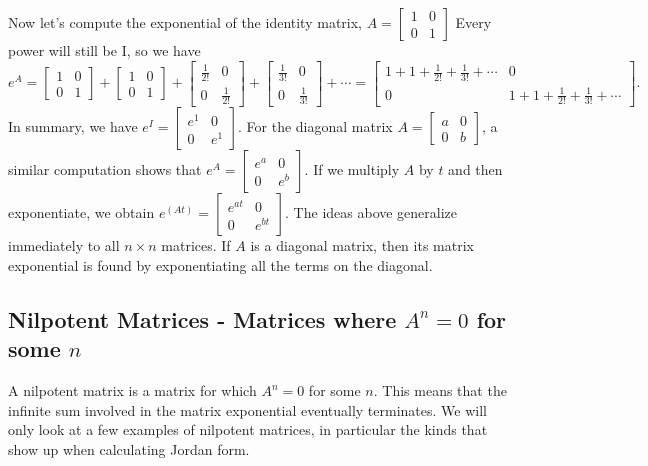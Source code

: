 \documentclass[10pt]{article}
\theoremstyle{plain}
\theoremstyle{box}
\begin{document}
Now let's compute the exponential of the identity matrix, $A=
\begin{bmatrix}
 1 & 0 \\
 0 & 1
\end{bmatrix}
$
Every power will still be I, so we have 
$$e^A = 
\begin{bmatrix}
 1 & 0 \\
 0 & 1
\end{bmatrix}
+
\begin{bmatrix}
 1 & 0 \\
 0 & 1
\end{bmatrix}
+
\begin{bmatrix}
 \frac{1}{2!} & 0 \\
 0 & \frac{1}{2!}
\end{bmatrix}
+
\begin{bmatrix}
 \frac{1}{3!} & 0 \\
 0 & \frac{1}{3!}
\end{bmatrix}
+\cdots = 
\begin{bmatrix}
 1+1+\frac{1}{2!}+\frac{1}{3!}+\cdots & 0 \\
 0 & 1+1+\frac{1}{2!}+\frac{1}{3!}+\cdots
\end{bmatrix}
.$$
In summary, we have $e^I = 
\begin{bmatrix}
 e^1 & 0 \\
 0 & e^1
\end{bmatrix}
$. For the diagonal matrix 
$A=
\begin{bmatrix}
 a & 0 \\
 0 & b
\end{bmatrix}
$, a similar computation shows that $e^{A} = 
\begin{bmatrix}
 e^a & 0 \\
 0 & e^b
\end{bmatrix}
.$  If we multiply $A$ by $t$ and then exponentiate, we obtain 
$e^(At) = 
\begin{bmatrix}
 e^{at} & 0 \\
 0 & e^{bt}
\end{bmatrix}
.$ 
The ideas above generalize immediately to all $n\times n$ matrices. If $A$ is a diagonal matrix, then its matrix exponential is found by exponentiating all the terms on the diagonal.  



\subsection{Nilpotent Matrices - Matrices where $A^n=0$ for some $n$}
A nilpotent matrix is a matrix for which $A^n=0$ for some $n$. This means that the infinite sum involved in the matrix exponential eventually terminates. We will only look at a few examples of nilpotent matrices, in particular the kinds that show up when calculating Jordan form. 
\end{document}
